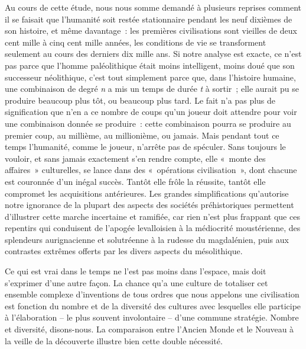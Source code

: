 \documentclass[french,twoside]{book} %
\begin{document}
Au cours de cette étude, nous nous somme demandé à plusieurs reprises comment il se faisait que l’humanité soit restée stationnaire pendant les neuf dixièmes de son histoire, et même davantage : les premières civilisations sont vieilles de deux cent mille à cinq cent mille années, les conditions de vie se transforment seulement au cours des derniers dix mille ans. Si notre analyse est exacte, ce n’est pas parce que l’homme paléolithique était moins intelligent, moins doué que son successeur néolithique, c’est tout simplement parce que, dans l’histoire humaine, une combinaison de degré \emph{n} a mis un temps de durée \emph{t} à sortir ; elle aurait pu se produire beaucoup plus tôt, ou beaucoup plus tard. Le fait n’a pas plus de signification que n’en a ce nombre de coups qu’un joueur doit attendre pour voir une combinaison donnée se produire : cette combinaison pourra se produire au premier coup, au millième, au millionième, ou jamais. Mais pendant tout ce temps l’humanité, comme le joueur, n’arrête pas de spéculer. Sans toujours le vouloir, et sans jamais exactement s’en rendre compte, elle « monte des affaires » culturelles, se lance dans des « opérations civilisation », dont chacune est couronnée d’un inégal succès. Tantôt elle frôle la réussite, tantôt elle compromet les acquisitions antérieures. Les grandes simplifications qu’autorise notre ignorance de la plupart des aspects des sociétés préhistoriques permettent d’illustrer cette marche incertaine et ramifiée, car rien n’est plus frappant que ces repentirs qui conduisent de l’apogée levalloisien à la médiocrité moustérienne, des splendeurs aurignacienne et solutréenne à la rudesse du magdalénien, puis aux contrastes extrêmes offerts par les divers aspects du mésolithique.\par
Ce qui est vrai dans le temps ne l’est pas moins dans l’espace, mais doit s’exprimer d’une autre façon. La chance qu’a une culture de totaliser cet ensemble complexe d’inventions de tous ordres que nous appelons une civilisation est fonction du nombre et de la diversité des cultures avec lesquelles elle participe à l’élaboration – le plus souvent involontaire – d’une commune stratégie. Nombre et diversité, disons-nous. La comparaison entre l’Ancien Monde et le Nouveau à la veille de la découverte illustre bien cette double nécessité.\par
\end{document}
